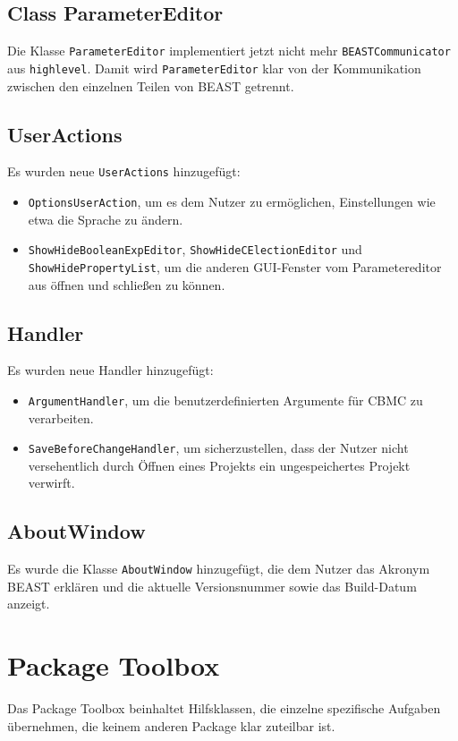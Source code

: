 \documentclass[a4paper]{scrreprt}
\begin{document}
\subsection{Class ParameterEditor}
Die Klasse \verb!ParameterEditor! implementiert jetzt nicht mehr \verb!BEASTCommunicator! aus \verb!highlevel!. Damit wird \verb!ParameterEditor! klar von der Kommunikation zwischen den einzelnen Teilen von BEAST getrennt. \\

\subsection{UserActions}
Es wurden neue \verb!UserActions! hinzugefügt:
\begin{itemize}
\item \verb!OptionsUserAction!, um es dem Nutzer zu ermöglichen, Einstellungen wie etwa die Sprache zu ändern.
\item \verb!ShowHideBooleanExpEditor!, \verb!ShowHideCElectionEditor! und \verb!ShowHidePropertyList!, um die anderen GUI-Fenster vom Parametereditor aus öffnen und schließen zu können.
\end{itemize}

\subsection{Handler}
Es wurden neue Handler hinzugefügt:
\begin{itemize}
\item \verb!ArgumentHandler!, um die benutzerdefinierten Argumente für CBMC zu verarbeiten.
\item \verb!SaveBeforeChangeHandler!, um sicherzustellen, dass der Nutzer nicht versehentlich durch Öffnen eines Projekts ein ungespeichertes Projekt verwirft.
\end{itemize}

\subsection{AboutWindow}
Es wurde die Klasse \verb!AboutWindow! hinzugefügt, die dem Nutzer das Akronym BEAST erklären und die aktuelle Versionsnummer sowie das Build-Datum anzeigt.

\section{Package Toolbox}
Das Package Toolbox beinhaltet Hilfsklassen, die einzelne spezifische Aufgaben übernehmen, die keinem anderen Package klar zuteilbar ist.
\end{document}
